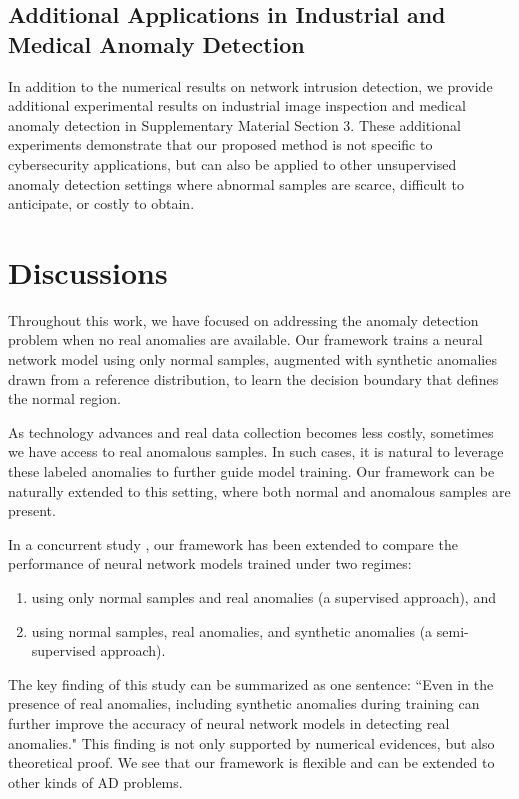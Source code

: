 \documentclass{article}
\begin{document}
\subsection{Additional Applications in Industrial and Medical Anomaly Detection}
In addition to the numerical results on network intrusion detection, we provide additional experimental results on industrial image inspection and medical anomaly detection in Supplementary Material Section 3. These additional experiments demonstrate that our proposed method is not specific to cybersecurity applications, but can also be applied to other unsupervised anomaly detection settings where abnormal samples are scarce, difficult to anticipate, or costly to obtain. 



\section{Discussions}\label{section:discussion}

Throughout this work, we have focused on addressing the anomaly detection problem when no real anomalies are available. Our framework trains a neural network model using only normal samples, augmented with synthetic anomalies drawn from a reference distribution, to learn the decision boundary that defines the normal region. 

As technology advances and real data collection becomes less costly, sometimes we have access to real anomalous samples. In such cases, it is natural to leverage these labeled anomalies to further guide model training. Our framework can be naturally extended to this setting, where both normal and anomalous samples are present.

In a concurrent study \citep{lau2025bridging}, our framework has been extended to compare the performance of neural network models trained under two regimes:
\begin{enumerate}
    \item using only normal samples and real anomalies (a supervised approach), and
\item using normal samples, real anomalies, and synthetic anomalies (a semi-supervised approach).
\end{enumerate}
The key finding of this study can be summarized as one sentence:
``Even in the presence of real anomalies, including synthetic anomalies during training can further improve the accuracy of neural network models in detecting real anomalies." This finding is not only supported by numerical evidences, but also theoretical proof. We see that our framework is flexible and can be extended to other kinds of AD problems.
\end{document}
